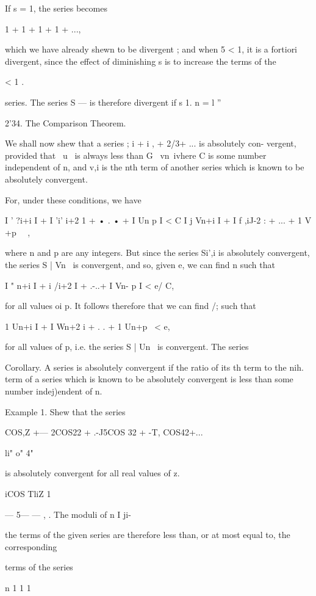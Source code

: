 If s = 1, the series becomes

1 + 1 + 1 + 1 + ...,

which we have already shewn to be divergent ; and when 5 < 1, it is a
fortiori divergent, since the effect of diminishing s is to increase
the terms of the

< 1 .

series. The series S — is therefore divergent if s 1. n = l ''

2'34. The Comparison Theorem.

We shall now shew that a series ; i + i , + 2/3+ ... is absolutely
con- vergent, provided that \ u \ is always less than G \ vn\, ivhere
C is some number independent of n, and v,i is the nth term of another
series which is known to be absolutely convergent.

For, under these conditions, we have

I ' ?i+i I + I 'i' i+2 1 + • . • + I Un p I < C I j Vn+i I + I f ,iJ-2
: + ... + 1 V +p \ \ ,

where n and p are any integers. But since the series Si',i is
absolutely convergent, the series S | Vn \ is convergent, and so,
given e, we can find n such that

I " n+i I + i /i+2 I + .-..+ I Vn- p I < e/ C,

for all values oi p. It follows therefore that we can find /; such
that

1 Un+i I + I Wn+2 i + . . + 1 Un+p \ < e,

for all values of p, i.e. the series S | Un \ is convergent. The
series %

Corollary. A series is absolutely convergent if the ratio of its th
term to the nih. term of a series which is known to be absolutely
convergent is less than some number indej)endent of n.

Example 1. Shew that the series

COS,Z +— 2COS22 + .-J5COS 32 + -T, COS42+...

li" o" 4"

is absolutely convergent for all real values of z.

iCOS TliZ 1

— 5— — , . The moduli of n I ji-

the terms of the given series are therefore less than, or at most
equal to, the corresponding

terms of the series

n 1 1 1

